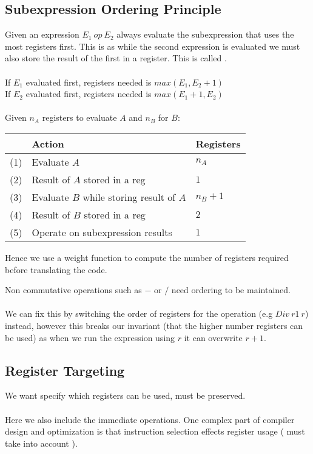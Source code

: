 \documentclass{report}
\begin{document}
\subsection*{Subexpression Ordering Principle}
Given an expression $E_1 \ op \ E_2$ always evaluate the subexpression that uses the most registers first. This is as while the second expression is evaluated we must also store the result of the first in a register. This is called .
\\
\\ If $E_1$ evaluated first, registers needed is $max(E_1, E_2 + 1)$
\\ If $E_2$ evaluated first, registers needed is $max(E_1 + 1, E_2)$
\\
\\ Given $n_A$ registers to evaluate $A$ and $n_B$ for $B$:
\begin{center}
	\begin{tabular}{l l l}
		    & \textbf{Action}                          & \textbf{Registers} \\
		\hline
		(1) & Evaluate $A$                             & $n_A$              \\
		(2) & Result of $A$ stored in a reg            & $1$                \\
		(3) & Evaluate $B$ while storing result of $A$ & $n_B + 1$          \\
		(4) & Result of $B$ stored in a reg            & $2$                \\
		(5) & Operate on subexpression results         & $1$                \\
	\end{tabular}
\end{center}
Hence we use a weight function to compute the number of registers required before translating the code.

Non commutative operations such as $-$ or $/$ need ordering to be maintained.
\\
\\ We can fix this by switching the order of registers for the operation (e.g $Div \ r1 \ r$) instead, however this breaks our invariant (that the higher number registers can be used) as when we run the expression using $r$ it can overwrite $r+1$.

\subsection*{Register Targeting}
We want specify which registers can be used, must be preserved.
\\
\\ Here we also include the immediate operations. One complex part of compiler design and optimization is that instruction selection effects register usage ( must take into account ).
\end{document}
